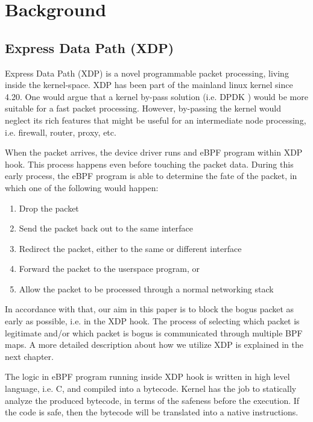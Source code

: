 \documentclass[sigplan,screen]{acmart}
\begin{document}
\section{Background}
\subsection{Express Data Path (XDP)}
Express Data Path (XDP) \cite{10.1145/3281411.3281443} is a novel programmable packet processing, living inside the kernel-space. XDP has been part of the mainland linux kernel since 4.20. One would argue that a kernel by-pass solution (i.e. DPDK \cite{dpdk}) would be more suitable for a fast packet processing. However, by-passing the kernel would neglect its rich features that might be useful for an intermediate node processing, i.e. firewall, router, proxy, etc. 


When the packet arrives, the device driver runs and eBPF program within XDP hook. This process happens even before touching the packet data. During this early process, the eBPF program is able to determine the fate of the packet, in which one of the following would happen:
\begin{enumerate}
\item Drop the packet
\item Send the packet back out to the same interface
\item Redirect the packet, either to the same or different interface
\item Forward the packet to the userspace program, or
\item Allow the packet to be processed through a normal networking stack
\end{enumerate}
In accordance with that, our aim in this paper is to block the bogus packet as early as possible, i.e. in the XDP hook. The process of selecting which packet is legitimate and/or which packet is bogus is communicated through multiple BPF maps. A more detailed description about how we utilize XDP is explained in the next chapter. 

The logic in eBPF program running inside XDP hook is written in high level language, i.e. C, and compiled into a bytecode. Kernel has the job to statically analyze the produced bytecode, in terms of the safeness before the execution. If the code is safe, then the bytecode will be translated into a native instructions.
\end{document}

